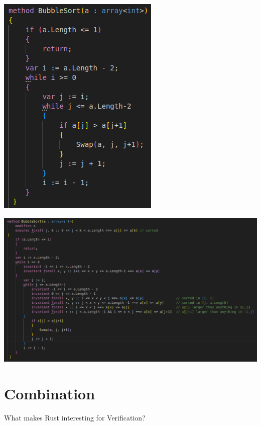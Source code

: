 \documentclass{beamer}
\begin{document}
\begin{frame}
\includegraphics[scale=0.6]{pictures/verification/bubblesort.png}
\end{frame}

\begin{frame}
\begin{center}
\includegraphics[scale=0.3]{pictures/verification/bubblesort_annotated.png}
\end{center}
\end{frame}

\section{Combination}
\begin{frame}{}
\begin{center}
What makes Rust interesting for Verification?
\end{center}
\end{frame}
\end{document}
